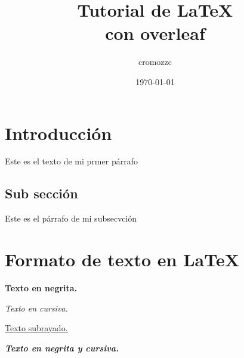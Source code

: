 \documentclass[titlepage,12pt]{article}
\title{Tutorial de {\LaTeX} \\ con overleaf}
\author{cromozzc}
\date{\today}
\begin{document}
\maketitle
\tableofcontents
\newpage    %

\section{Introducción}
Este es el texto de mi prmer párrafo

\subsection{Sub sección}
Este es el párrafo de mi subsecvción

\section{Formato de texto en {\LaTeX}}
\textbf{Texto en negrita.}

\emph{Texto en cursiva.}

\underline{Texto subrayado.}

\textbf{{\emph{Texto en negrita y cursiva.}}}
\end{document}
